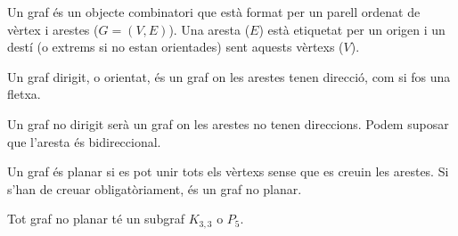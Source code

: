 \documentclass[../main.tex]{subfiles}
\begin{document}
    \begin{definicio}
        Un graf és un objecte combinatori que està format per un parell ordenat de vèrtex i arestes ($G = (V, E)$).
        Una aresta ($E$) està etiquetat per un origen i un destí (o extrems si no estan orientades)
        sent aquests vèrtexs ($V$).
    \end{definicio}
    \begin{definicio}
        Un graf dirigit, o orientat, és un graf on les arestes tenen direcció, com si fos una fletxa.
    \end{definicio}
    \begin{definicio}
        Un graf no dirigit serà un graf on les arestes no tenen direccions. Podem suposar que
        l'aresta és bidireccional.
    \end{definicio}
    \begin{definicio}
        Un graf és planar si es pot unir tots els vèrtexs sense que es creuin les arestes.
        Si s'han de creuar obligatòriament, és un graf no planar.
    \end{definicio}
    \begin{teorema}
        Tot graf no planar té un subgraf $K_{3,3}$ o $P_5$.
    \end{teorema}
\end{document}
